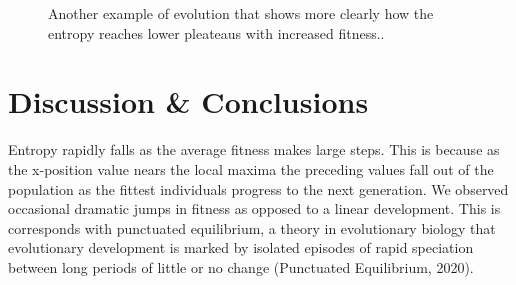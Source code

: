 \documentclass[11pt]{article}
\begin{document}
\begin{figure}[h!]
  \centering
  \caption{Another example of evolution that shows more clearly how
    the entropy reaches lower pleateaus with increased fitness..}
  \label{fig:gen-info_pid3027915}
\end{figure}




\section{Discussion \& Conclusions}
\label{sec:org7999995}

Entropy rapidly falls as the average fitness makes large steps. This
is because as the x-position value nears the local maxima the
preceding values fall out of the population as the fittest individuals
progress to the next generation. We observed occasional dramatic jumps
in fitness as opposed to a linear development. This is corresponds
with punctuated equilibrium, a theory in evolutionary biology that
evolutionary development is marked by isolated episodes of rapid
speciation between long periods of little or no change (Punctuated
Equilibrium, 2020).
\end{document}
